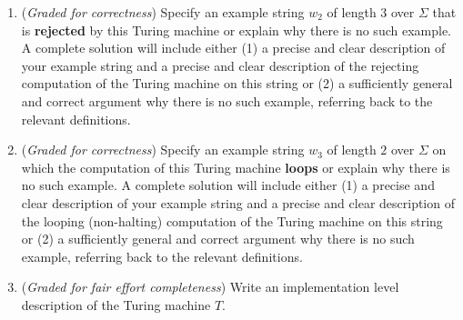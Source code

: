 \documentclass[12pt, oneside]{article}
\begin{document}
\begin{enumerate}
\begin{enumerate}
        {\it Hint:} In class we've drawn pictures to represent the configuration of the machine at each step 
        in a computation.  You may do so or you may choose to describe these configurations in words.
        
        \item ({\it Graded for correctness}) Specify an example string $w_2$ of length $3$ over $\Sigma$ 
        that is {\bf rejected} by this Turing machine
        or explain why there is no such 
        example. A complete solution will include either (1) a precise and clear 
        description of your example  string and a precise and clear description of the rejecting computation
        of the Turing machine on this string or (2) a sufficiently
        general and correct argument why there is no such example, referring back to the relevant definitions.

        \item ({\it Graded for correctness}) Specify an example string $w_3$ of length $2$ over $\Sigma$ 
        on which  the computation of this Turing machine {\bf loops}
        or explain why there is no such 
        example. A complete solution will include either (1) a precise and clear 
        description of your example  string and a precise and clear description of the looping (non-halting) 
        computation
        of the Turing machine on this string or (2) a sufficiently
        general and correct argument why there is no such example, referring back to the relevant definitions.

        \item ({\it Graded for fair effort completeness}) Write an implementation level description of 
        the Turing machine $T$.
\end{enumerate}

\end{enumerate}
\end{document}
